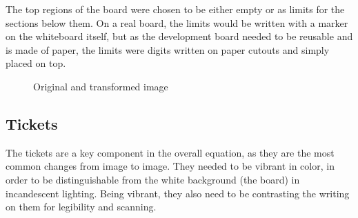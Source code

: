 \documentclass[12pt]{report}
\theoremstyle{definition}
\theoremstyle{remark}
\begin{document}
The top regions of the board were chosen to be either empty or as limits for the sections below them. On a real board, the limits would be written with a marker on the whiteboard itself, but as the development board needed to be reusable and is made of paper, the limits were digits written on paper cutouts and simply placed on top.

\begin{figure}%
    \centering
    \qquad
    \caption{Original and transformed image}%
    \label{fig:transformation}%
\end{figure}

\subsection{Tickets}
The tickets are a key component in the overall equation, as they are the most common changes from image to image. They needed to be vibrant in color, in order to be distinguishable from the white background (the board) in incandescent lighting. Being vibrant, they also need to be contrasting the writing on them for legibility and scanning.
\end{document}
